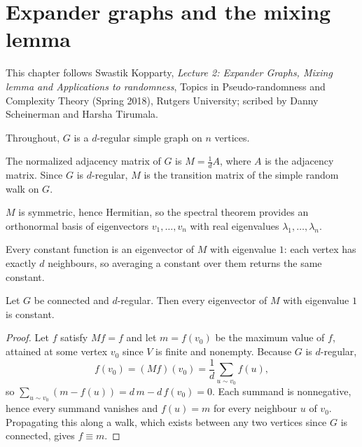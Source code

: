\chapter{Expander graphs and the mixing lemma}

This chapter follows Swastik Kopparty, \emph{Lecture 2: Expander Graphs, Mixing lemma and
Applications to randomness}, Topics in Pseudo-randomness and Complexity Theory (Spring 2018),
Rutgers University; scribed by Danny Scheinerman and Harsha Tirumala.

Throughout, $G$ is a $d$-regular simple graph on $n$ vertices.

\begin{definition}
\label{def:norm_adj_matrix}
\leanok
The normalized adjacency matrix of $G$ is $M = \frac{1}{d} A$, where $A$ is the adjacency matrix.
Since $G$ is $d$-regular, $M$ is the transition matrix of the simple random walk on $G$.
\end{definition}

\begin{lemma}
\label{lem:norm_adj_matrix_isHermitian}
\leanok
$M$ is symmetric, hence Hermitian, so the spectral theorem provides an orthonormal basis of
eigenvectors $v_1, \dots, v_n$ with real eigenvalues $\lambda_1, \dots, \lambda_n$.
\end{lemma}

\begin{lemma}
\label{lem:norm_adj_matrix_mulVec_const}
\leanok
Every constant function is an eigenvector of $M$ with eigenvalue $1$: each vertex has exactly
$d$ neighbours, so averaging a constant over them returns the same constant.
\end{lemma}

\begin{theorem}
\label{thm:eq_const_of_mulVec_eq}
\leanok
Let $G$ be connected and $d$-regular. Then every eigenvector of $M$ with eigenvalue $1$ is
constant.
\end{theorem}

\begin{proof}
\leanok
Let $f$ satisfy $Mf = f$ and let $m = f(v_0)$ be the maximum value of $f$, attained at some
vertex $v_0$ since $V$ is finite and nonempty. Because $G$ is $d$-regular,
$$ f(v_0) = (Mf)(v_0) = \frac{1}{d} \sum_{u \sim v_0} f(u), $$
so $\sum_{u \sim v_0} (m - f(u)) = d\,m - d\,f(v_0) = 0$. Each summand is nonnegative, hence every
summand vanishes and $f(u) = m$ for every neighbour $u$ of $v_0$. Propagating this along a walk,
which exists between any two vertices since $G$ is connected, gives $f \equiv m$.
\end{proof}

